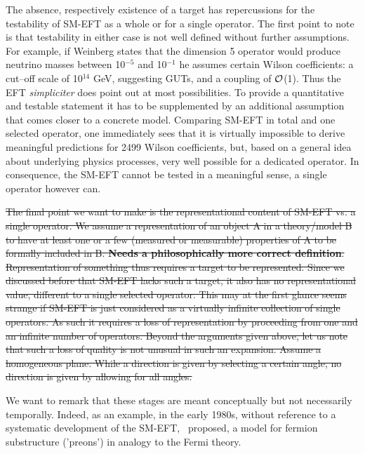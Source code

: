 {The absence, respectively existence of a target has repercussions for the testability of
SM-EFT as a whole or for a single operator.
The first point to note is that testability in either case is not well defined without
further assumptions.
For example, if Weinberg states that the dimension 5 operator would produce neutrino masses
between 10$^{-5}$ and 10$^{-1}$ he assumes certain Wilson coefficients: a cut--off scale of 
10$^{14}$ GeV, suggesting GUTs, and a coupling of $\cal{O}$(1).
Thus the EFT \textit{simpliciter} does point out at most possibilities. 
To provide a quantitative
and testable statement it has to be supplemented by an additional assumption that comes
closer to a concrete model.
Comparing SM-EFT in total and one selected operator, one immediately sees that it is
virtually impossible to derive meaningful predictions for 2499 Wilson coefficients, but,
based on a general idea about underlying physics processes, very well possible for 
a dedicated operator.
In consequence, the SM-EFT cannot be tested in a meaningful sense, a single operator however can. 
  
\sout{The final point we want to make is the representational content of SM-EFT vs. a single
operator.
We assume a representation of an object A in a theory/model B to have at least one 
or a few (measured or measurable) properties of A to be formally included in B.
\textbf{Needs a philosophically more correct definition}.
Representation of something thus requires a target to be represented.
Since we discussed before that SM-EFT lacks such a target, it also has no representational
value, different to a single selected operator.
This may at the first glance seems strange if SM-EFT is just considered as a virtually
infinite collection of single operators. 
As such it requires a loss of representation by proceeding from one and an infinite number of operators.
Beyond the arguments given above, let us note that such a loss of quality is not unusual
in such an expansion.
Assume a homogeneous plane. 
While a direction is given by selecting a certain angle, no direction is given by allowing for
all angles.}

We want to remark that these stages are meant conceptually but not necessarily temporally.
Indeed, as an example, in the early 1980s, without reference to
a systematic development of the SM-EFT,~\citep{Eichten:1983hw} proposed,
a model for fermion substructure ('preons') in analogy to the Fermi theory.

}

